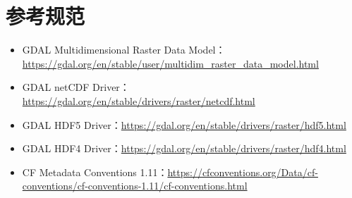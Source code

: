 \documentclass[UTF8,fontset=fandol,11pt]{ctexart}
\begin{document}
\section{参考规范}

\begin{itemize}
  \item GDAL Multidimensional Raster Data Model：\url{https://gdal.org/en/stable/user/multidim_raster_data_model.html}
  \item GDAL netCDF Driver：\url{https://gdal.org/en/stable/drivers/raster/netcdf.html}
  \item GDAL HDF5 Driver：\url{https://gdal.org/en/stable/drivers/raster/hdf5.html}
  \item GDAL HDF4 Driver：\url{https://gdal.org/en/stable/drivers/raster/hdf4.html}
  \item CF Metadata Conventions 1.11：\url{https://cfconventions.org/Data/cf-conventions/cf-conventions-1.11/cf-conventions.html}
\end{itemize}
\end{document}
